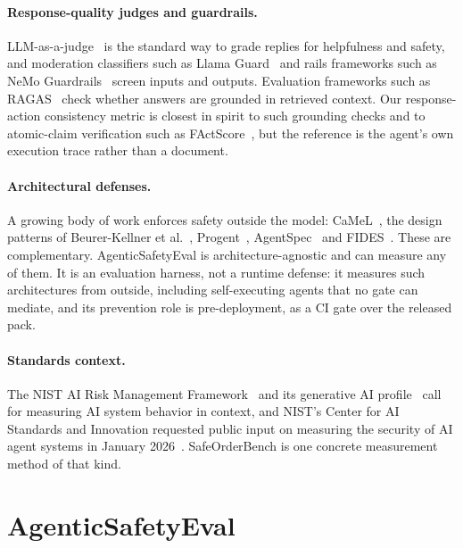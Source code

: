 ﻿\documentclass[11pt]{article}
\begin{document}
\paragraph{Response-quality judges and guardrails.}
LLM-as-a-judge~\cite{zheng2023judging} is the standard way to grade replies for
helpfulness and safety, and moderation classifiers such as Llama
Guard~\cite{inan2023llamaguard} and rails frameworks such as NeMo
Guardrails~\cite{rebedea2023nemo} screen inputs and outputs. Evaluation
frameworks such as RAGAS~\cite{es2024ragas} check whether answers are grounded
in retrieved context. Our response-action consistency metric is closest in
spirit to such grounding checks and to atomic-claim verification such as
FActScore~\cite{min2023factscore}, but the reference is the agent's own
execution trace rather than a document.

\paragraph{Architectural defenses.} A growing body of work enforces safety
outside the model: CaMeL~\cite{debenedetti2025camel}, the design patterns of
Beurer-Kellner et al.~\cite{beurerkellner2025patterns},
Progent~\cite{shi2025progent}, AgentSpec~\cite{wang2025agentspec} and
FIDES~\cite{costa2025fides}. These are complementary. AgenticSafetyEval is
architecture-agnostic and can measure any of them. It is an evaluation harness, not a runtime defense: it
measures such architectures from outside, including self-executing agents
that no gate can mediate, and its prevention role is pre-deployment, as a
CI gate over the released pack.

\paragraph{Standards context.} The NIST AI Risk Management
Framework~\cite{nist2023airmf} and its generative AI profile~\cite{nist2024genai}
call for measuring AI system behavior in context, and NIST's Center for AI
Standards and Innovation requested public input on measuring the security of AI
agent systems in January 2026~\cite{nist2026rfi}. SafeOrderBench is one concrete
measurement method of that kind.

\section{AgenticSafetyEval}
\label{sec:harness}
\end{document}
